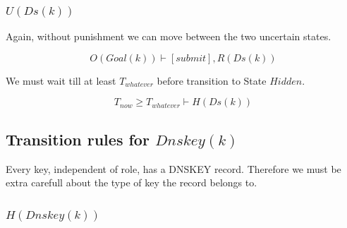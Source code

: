 \documentclass[twoside,english, a4paper]{article}
\newcommand{\mathbox}[1]{#1}
\begin{document}
\subsubsection{$U(Ds(k))$}

\mathbox{

	Again, without punishment we can move between the two uncertain 
	states.

	\begin{equation}
			O(Goal(k)) \vdash [submit], R(Ds(k)) 
	\end{equation}

	We must wait till at least $T_{whatever}$ before transition to State 
	$Hidden$.
	
	\begin{equation}
			T_{now} \geq T_{whatever} \vdash H(Ds(k))
	\end{equation}
}


\subsection{Transition rules for $Dnskey(k)$}

Every key, independent of role, has a DNSKEY record. Therefore we must
be extra carefull about the type of key the record belongs to.

\subsubsection{$H(Dnskey(k))$}
\end{document}
